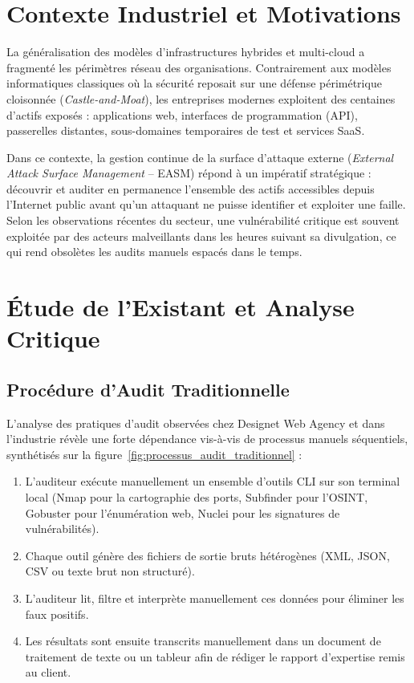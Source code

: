 \section{Contexte Industriel et Motivations}
\par La g\'en\'eralisation des mod\`eles d'infrastructures hybrides et multi-cloud a fragment\'e les p\'erim\`etres r\'eseau des organisations. Contrairement aux mod\`eles informatiques classiques o\`u la s\'ecurit\'e reposait sur une d\'efense p\'erim\'etrique cloisonn\'ee (\textit{Castle-and-Moat}), les entreprises modernes exploitent des centaines d'actifs expos\'es : applications web, interfaces de programmation (API), passerelles distantes, sous-domaines temporaires de test et services SaaS.
\par Dans ce contexte, la gestion continue de la surface d'attaque externe (\textit{External Attack Surface Management} -- EASM) r\'epond \`a un imp\'eratif strat\'egique : d\'ecouvrir et auditer en permanence l'ensemble des actifs accessibles depuis l'Internet public avant qu'un attaquant ne puisse identifier et exploiter une faille. Selon les observations r\'ecentes du secteur, une vuln\'erabilit\'e critique est souvent exploit\'ee par des acteurs malveillants dans les heures suivant sa divulgation, ce qui rend obsol\`etes les audits manuels espac\'es dans le temps.

\section{\'Etude de l'Existant et Analyse Critique}
\subsection{Proc\'edure d'Audit Traditionnelle}
\par L'analyse des pratiques d'audit observ\'ees chez Designet Web Agency et dans l'industrie r\'ev\`ele une forte d\'ependance vis-\`a-vis de processus manuels s\'equentiels, synth\'etis\'es sur la figure~\ref{fig:processus_audit_traditionnel} :
\begin{enumerate}
    \item L'auditeur ex\'ecute manuellement un ensemble d'outils CLI sur son terminal local (Nmap pour la cartographie des ports, Subfinder pour l'OSINT, Gobuster pour l'\'enum\'eration web, Nuclei pour les signatures de vuln\'erabilit\'es).
    \item Chaque outil g\'en\`ere des fichiers de sortie bruts h\'et\'erog\`enes (XML, JSON, CSV ou texte brut non structur\'e).
    \item L'auditeur lit, filtre et interpr\`ete manuellement ces donn\'ees pour \'eliminer les faux positifs.
    \item Les r\'esultats sont ensuite transcrits manuellement dans un document de traitement de texte ou un tableur afin de r\'ediger le rapport d'expertise remis au client.
\end{enumerate}

